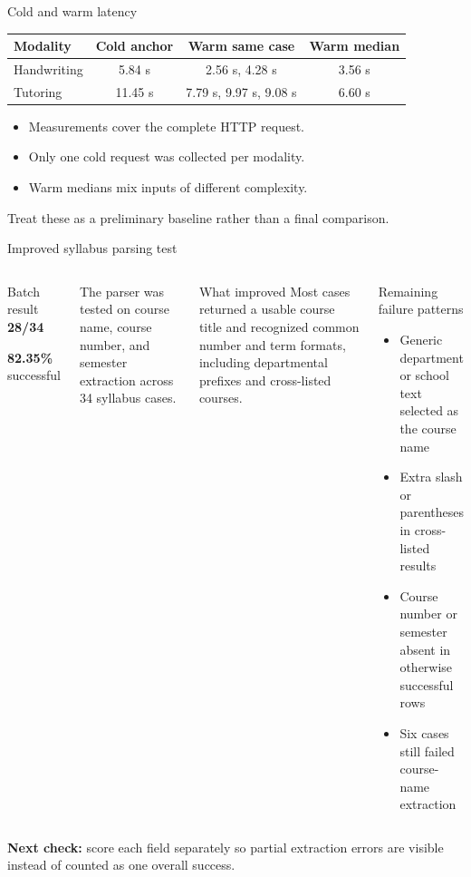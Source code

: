 \documentclass[aspectratio=169,10pt]{beamer}
\newcommand{\risk}[1]{\textcolor{Rust}{\textbf{#1}}}
\begin{document}
\begin{frame}{Cold and warm latency}
\centering
\begin{tabular}{@{}lccc@{}}\toprule
\textbf{Modality}&\textbf{Cold anchor}&\textbf{Warm same case}&\textbf{Warm median} \\\midrule
Handwriting&5.84 s&2.56 s, 4.28 s&3.56 s \\
Tutoring&11.45 s&7.79 s, 9.97 s, 9.08 s&6.60 s \\\bottomrule
\end{tabular}
\vspace{.8em}
\begin{itemize}
\item Measurements cover the complete HTTP request.
\item Only one cold request was collected per modality.
\item Warm medians mix inputs of different complexity.
\end{itemize}
\vspace{.3em}
Treat these as a preliminary baseline rather than a final comparison.
\end{frame}

\begin{frame}{Improved syllabus parsing test}
\begin{columns}[T,onlytextwidth]
\begin{block}{Batch result}
\centering
{\Huge\color{Forest}\textbf{28/34}}\par
\vspace{.25em}
{\Large\textbf{82.35\%}} successful
\end{block}
\small
The parser was tested on course name, course number, and semester extraction across 34 syllabus cases.
\begin{block}{What improved}
Most cases returned a usable course title and recognized common number and term formats, including departmental prefixes and cross-listed courses.
\end{block}
\begin{block}{Remaining failure patterns}
\begin{itemize}
\item Generic department or school text selected as the course name
\item Extra slash or parentheses in cross-listed results
\item Course number or semester absent in otherwise successful rows
\item Six cases still failed course-name extraction
\end{itemize}
\end{block}
\end{columns}
\vspace{.1em}
\centering\small
\risk{Next check:} score each field separately so partial extraction errors are visible instead of counted as one overall success.
\end{frame}
\end{document}
